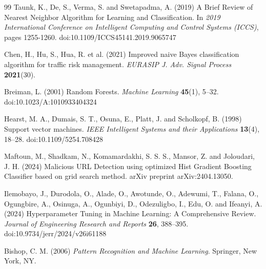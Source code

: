\documentclass[pdflatex,sn-nature]{sn-jnl}
\theoremstyle{thmstyleone}%
\theoremstyle{thmstyletwo}%
\theoremstyle{thmstylethree}%
\begin{document}
\begin{thebibliography}{99}
Taunk, K., De, S., Verma, S. and Swetapadma, A. (2019) A Brief Review of Nearest Neighbor Algorithm for Learning and Classification. In \emph{2019 International Conference on Intelligent Computing and Control Systems (ICCS)}, pages 1255-1260. doi:10.1109/ICCS45141.2019.9065747

Chen, H., Hu, S., Hua, R. et al. (2021) Improved naive Bayes classification algorithm for traffic risk management. \emph{EURASIP J. Adv. Signal Process} \textbf{2021}(30).

Breiman, L. (2001) Random Forests. \emph{Machine Learning} \textbf{45}(1), 5--32. doi:10.1023/A:1010933404324

Hearst, M. A., Dumais, S. T., Osuna, E., Platt, J. and Scholkopf, B. (1998) Support vector machines. \emph{IEEE Intelligent Systems and their Applications} \textbf{13}(4), 18--28. doi:10.1109/5254.708428

Maftoun, M., Shadkam, N., Komamardakhi, S. S. S., Mansor, Z. and Joloudari, J. H. (2024) Malicious URL Detection using optimized Hist Gradient Boosting Classifier based on grid search method. arXiv preprint arXiv:2404.13050.

Ilemobayo, J., Durodola, O., Alade, O., Awotunde, O., Adewumi, T., Falana, O., Ogungbire, A., Osinuga, A., Ogunbiyi, D., Odezuligbo, I., Edu, O. and Ifeanyi, A. (2024) Hyperparameter Tuning in Machine Learning: A Comprehensive Review. \emph{Journal of Engineering Research and Reports} \textbf{26}, 388--395. doi:10.9734/jerr/2024/v26i61188

Bishop, C. M. (2006) \emph{Pattern Recognition and Machine Learning}. Springer, New York, NY.


\end{thebibliography}
\end{document}
